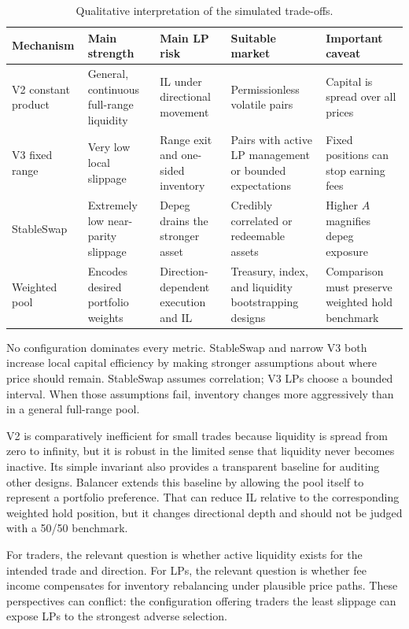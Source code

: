 \documentclass[11pt,twocolumn]{article}
\begin{document}
\begin{table}[!tbp]
\centering
\caption{Qualitative interpretation of the simulated trade-offs.}
\small
\begin{tabular}{p{}p{}p{}p{}p{}}
\toprule
Mechanism & Main strength & Main LP risk & Suitable market & Important caveat\\
\midrule
V2 constant product & General, continuous full-range liquidity & IL under directional movement & Permissionless volatile pairs & Capital is spread over all prices\\
V3 fixed range & Very low local slippage & Range exit and one-sided inventory & Pairs with active LP management or bounded expectations & Fixed positions can stop earning fees\\
StableSwap & Extremely low near-parity slippage & Depeg drains the stronger asset & Credibly correlated or redeemable assets & Higher $A$ magnifies depeg exposure\\
Weighted pool & Encodes desired portfolio weights & Direction-dependent execution and IL & Treasury, index, and liquidity bootstrapping designs & Comparison must preserve weighted hold benchmark\\
\bottomrule
\end{tabular}
\end{table}

No configuration dominates every metric. StableSwap and narrow V3 both
increase local capital efficiency by making stronger assumptions about where
price should remain. StableSwap assumes correlation; V3 LPs choose a bounded
interval. When those assumptions fail, inventory changes more aggressively
than in a general full-range pool.

V2 is comparatively inefficient for small trades because liquidity is spread
from zero to infinity, but it is robust in the limited sense that liquidity
never becomes inactive. Its simple invariant also provides a transparent
baseline for auditing other designs. Balancer extends this baseline by
allowing the pool itself to represent a portfolio preference. That can reduce
IL relative to the corresponding weighted hold position, but it changes
directional depth and should not be judged with a 50/50 benchmark.

For traders, the relevant question is whether active liquidity exists for the
intended trade and direction. For LPs, the relevant question is whether fee
income compensates for inventory rebalancing under plausible price paths.
These perspectives can conflict: the configuration offering traders the least
slippage can expose LPs to the strongest adverse selection.
\end{document}
